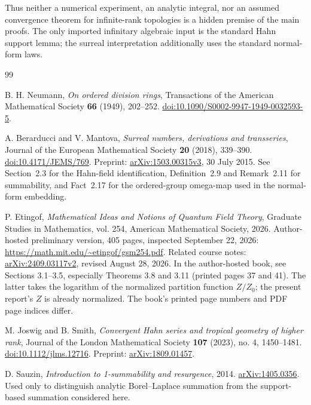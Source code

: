 \documentclass[11pt,letterpaper]{article}
\numberwithin{equation}{section}
\theoremstyle{definition}
\theoremstyle{remark}
\begin{document}
Thus neither a numerical experiment, an analytic integral, nor an assumed
convergence theorem for infinite-rank topologies is a hidden premise of the
main proofs. The only imported infinitary algebraic input is the standard
Hahn support lemma; the surreal interpretation additionally uses the
standard normal-form laws.

\clearpage
{}
\begin{thebibliography}{99}

B. H. Neumann,
\emph{On ordered division rings},
Transactions of the American Mathematical Society \textbf{66} (1949),
202--252.
\href{https://doi.org/10.1090/S0002-9947-1949-0032593-5}
{doi:10.1090/S0002-9947-1949-0032593-5}.

A. Berarducci and V. Mantova,
\emph{Surreal numbers, derivations and transseries},
Journal of the European Mathematical Society \textbf{20} (2018), 339--390.
\href{https://doi.org/10.4171/JEMS/769}{doi:10.4171/JEMS/769}.
Preprint: \href{https://arxiv.org/abs/1503.00315v3}{arXiv:1503.00315v3},
30 July 2015. See Section~2.3 for the Hahn-field identification,
Definition~2.9 and Remark~2.11 for summability, and Fact~2.17 for the
ordered-group omega-map used in the normal-form embedding.

P. Etingof,
\emph{Mathematical Ideas and Notions of Quantum Field Theory},
Graduate Studies in Mathematics, vol. 254,
American Mathematical Society, 2026.
Author-hosted preliminary version, 405 pages, inspected September 22, 2026:
\url{https://math.mit.edu/~etingof/gsm254.pdf}.
Related course notes:
\href{https://arxiv.org/abs/2409.03117v2}{arXiv:2409.03117v2},
revised August 28, 2026.
In the author-hosted book, see Sections 3.1--3.5, especially Theorems 3.8
and 3.11 (printed pages 37 and 41). The latter takes the logarithm of
the normalized partition function $Z/Z_0$; the present report's $Z$ is
already normalized. The book's printed page numbers and PDF page indices differ.

M. Joswig and B. Smith,
\emph{Convergent Hahn series and tropical geometry of higher rank},
Journal of the London Mathematical Society \textbf{107} (2023), no. 4,
1450--1481.
\href{https://doi.org/10.1112/jlms.12716}{doi:10.1112/jlms.12716}.
Preprint: \href{https://arxiv.org/abs/1809.01457}{arXiv:1809.01457}.

D. Sauzin,
\emph{Introduction to 1-summability and resurgence}, 2014.
\href{https://arxiv.org/abs/1405.0356}{arXiv:1405.0356}.
Used only to distinguish analytic Borel--Laplace summation from the
support-based summation considered here.


\end{thebibliography}
\end{document}
